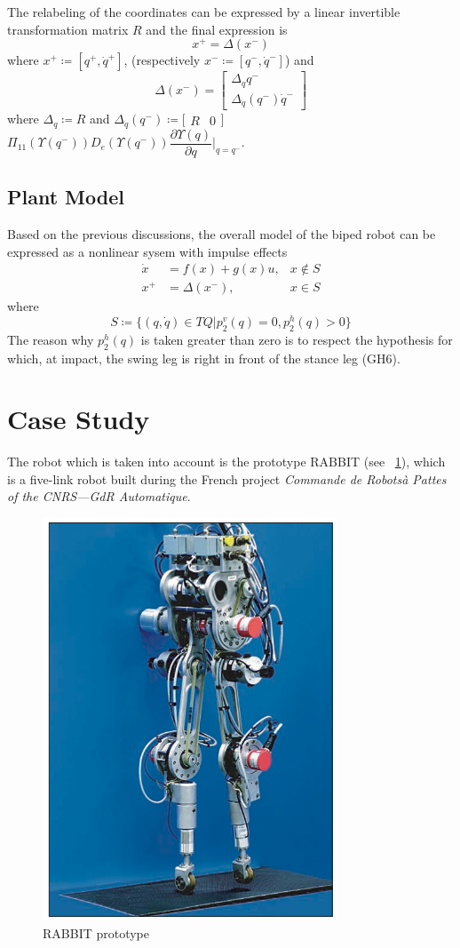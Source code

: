 \documentclass[11pt]{article}
\begin{document}
The relabeling of the coordinates can be expressed by a linear invertible transformation matrix $R$ and the final expression is
\begin{equation}
x^+ = \Delta(x^-)
\end{equation}
where $x^+ \coloneqq [q^+,\dot{q}^+]$, (respectively $x^- \coloneqq [q^-, \dot{q}^-]$) and 
\begin{equation}
\Delta(x^-) =
\begin{bmatrix}
\Delta_q q^- \\
\Delta_{\dot{q}}(q^-) \dot{q}^-
\end{bmatrix}
\end{equation}
where $\Delta_q \coloneqq R$ and $\Delta_{\dot{q}}(q^-) \coloneqq \bigl[
\begin{matrix}
R & 0
\end{matrix}\bigr]$
$\Pi_{11}(\Upsilon(q^-))D_e(\Upsilon(q^-))\dfrac{\partial \Upsilon(q)}{\partial q}\vert_{q = q^-}$.

\subsection{Plant Model}
Based on the previous discussions, the overall model of the biped robot can be expressed as a nonlinear sysem with impulse effects
\begin{align}
\dot{x} &= f(x) + g(x)u, & x \notin S \\
x^+ &= \Delta(x^-), & x \in S 
\end{align}
where 
\begin{equation*}
S \coloneqq \{(q,\dot{q}) \in TQ\vert p^v_2(q) = 0, p^h_2(q) >0\}
\end{equation*}
The reason why $p^h_2(q)$ is taken greater than zero is to respect the hypothesis for which, at impact, the swing leg is right in front of the stance leg (GH6).

\section{Case Study}
The robot which is taken into account is the prototype RABBIT (see \figurename \, \ref{fig: RABBIT_color}), which is a five-link robot built during the French project \textit{Commande de Robotsà Pattes of the CNRS—GdR Automatique}. 

\begin{figure}[H]
\centering
\includegraphics[width=.32\textwidth]{Images/RABBIT_color.png}
\caption{RABBIT prototype}
\label{fig: RABBIT_color}
\end{figure}
\end{document}

